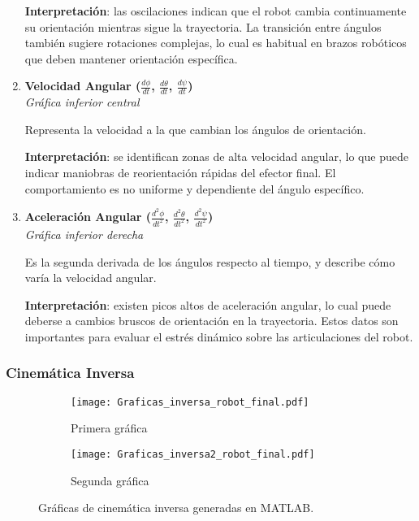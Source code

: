 \begin{enumerate}
 	\textbf{Interpretación}: las oscilaciones indican que el robot cambia continuamente su orientación mientras sigue la trayectoria. La transición entre ángulos también sugiere rotaciones complejas, lo cual es habitual en brazos robóticos que deben mantener orientación específica.
 	
 	\item \textbf{Velocidad Angular ($\frac{d\phi}{dt}$, $\frac{d\theta}{dt}$, $\frac{d\psi}{dt}$)} \\
 	\textit{Gráfica inferior central}
 	
 	Representa la velocidad a la que cambian los ángulos de orientación.
 	
 	\textbf{Interpretación}: se identifican zonas de alta velocidad angular, lo que puede indicar maniobras de reorientación rápidas del efector final. El comportamiento es no uniforme y dependiente del ángulo específico.
 	
 	\item \textbf{Aceleración Angular ($\frac{d^2\phi}{dt^2}$, $\frac{d^2\theta}{dt^2}$, $\frac{d^2\psi}{dt^2}$)} \\
 	\textit{Gráfica inferior derecha}
 	
 	Es la segunda derivada de los ángulos respecto al tiempo, y describe cómo varía la velocidad angular.
 	
 	\textbf{Interpretación}: existen picos altos de aceleración angular, lo cual puede deberse a cambios bruscos de orientación en la trayectoria. Estos datos son importantes para evaluar el estrés dinámico sobre las articulaciones del robot.
 \end{enumerate}
 
\subsubsection{Cinemática Inversa}
\vspace{-12.5em}  %

\begin{figure}[H]
	\centering
	 \captionsetup[subfigure]{aboveskip=-100pt, belowskip=0pt}
	\begin{subfigure}[c]{0.495\textwidth}
		\centering
		\texttt{[image: Graficas\_inversa\_robot\_final.pdf]}
		\caption{Primera gráfica}
		\label{fig:inversa1}
	\end{subfigure}
	\hfill
	\begin{subfigure}[c]{0.495\textwidth}
		\centering
		\texttt{[image: Graficas\_inversa2\_robot\_final.pdf]}
		\caption{Segunda gráfica}
		\label{fig:inversa2}
	\end{subfigure}
	\captionsetup{aboveskip=2pt}
	\caption{Gráficas de cinemática inversa generadas en MATLAB.}
	\label{fig:cinematicaInversaFinal}
	\vspace{-3.5em}
	
\end{figure}
\vspace{5em} 

